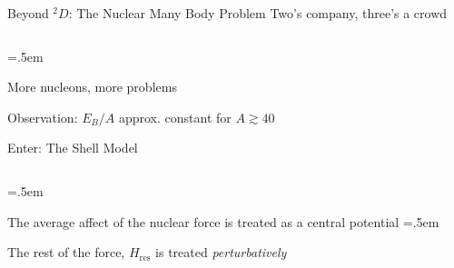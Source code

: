 \documentclass[xcolor={dvipsnames}]{beamer}
\let\olditemize=\itemize
\let\endolditemize=\enditemize
\renewenvironment{itemize}{\olditemize \itemsep=.5em }{\endolditemize}
\begin{document}
\begin{frame}{Beyond ${}^2D$: The Nuclear Many Body Problem}
\alert{Two's company, three's a crowd}
\begin{columns}
\begin{column}{.6\textwidth}
\begin{itemize}
    \item<2-> More nucleons, more problems
    \item<3-> Observation: $E_B/A$ approx. constant for $A\gtrsim40$
    \item<4-> Enter: The Shell Model
\end{itemize}
\end{column}
\begin{column}{.4\textwidth}
    \vspace{-2em}
\end{column}
\end{columns}
\begin{itemize}
    \item<6-> The average affect of the nuclear force is treated as a central potential
    \begin{itemize}
        \item<7-> The rest of the force, $H_\text{res}$ is treated \textit{perturbatively}
    \end{itemize}
\end{itemize}
\end{frame}
\end{document}
